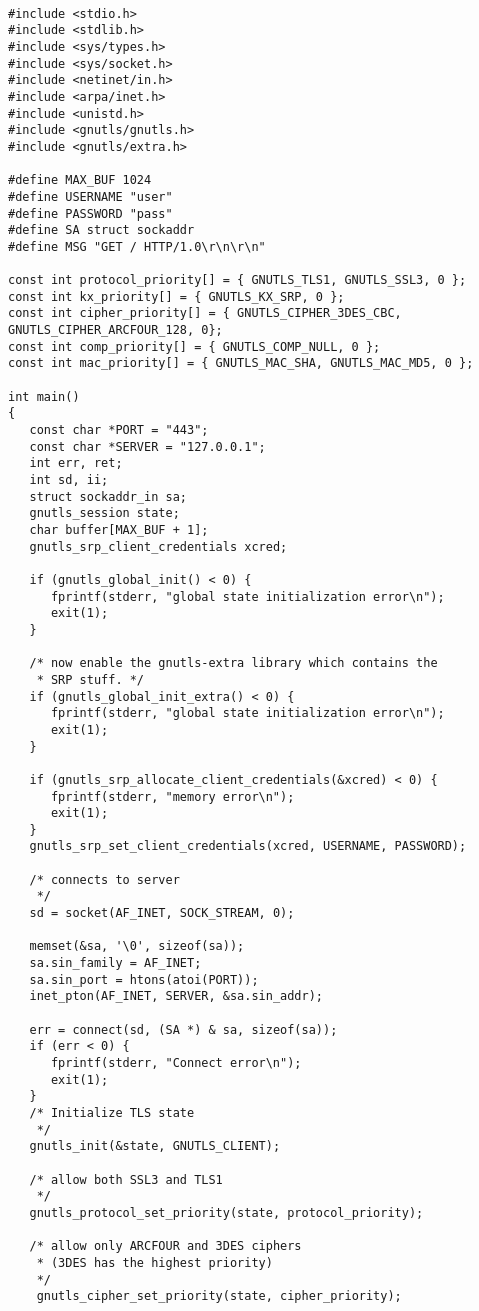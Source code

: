 \begin{verbatim}

#include <stdio.h>
#include <stdlib.h>
#include <sys/types.h>
#include <sys/socket.h>
#include <netinet/in.h>
#include <arpa/inet.h>
#include <unistd.h>
#include <gnutls/gnutls.h>
#include <gnutls/extra.h>

#define MAX_BUF 1024
#define USERNAME "user"
#define PASSWORD "pass"
#define SA struct sockaddr
#define MSG "GET / HTTP/1.0\r\n\r\n"

const int protocol_priority[] = { GNUTLS_TLS1, GNUTLS_SSL3, 0 };
const int kx_priority[] = { GNUTLS_KX_SRP, 0 };
const int cipher_priority[] = { GNUTLS_CIPHER_3DES_CBC, GNUTLS_CIPHER_ARCFOUR_128, 0};
const int comp_priority[] = { GNUTLS_COMP_NULL, 0 };
const int mac_priority[] = { GNUTLS_MAC_SHA, GNUTLS_MAC_MD5, 0 };

int main()
{
   const char *PORT = "443";
   const char *SERVER = "127.0.0.1";
   int err, ret;
   int sd, ii;
   struct sockaddr_in sa;
   gnutls_session state;
   char buffer[MAX_BUF + 1];
   gnutls_srp_client_credentials xcred;

   if (gnutls_global_init() < 0) {
      fprintf(stderr, "global state initialization error\n");
      exit(1);
   }

   /* now enable the gnutls-extra library which contains the
    * SRP stuff. */
   if (gnutls_global_init_extra() < 0) {
      fprintf(stderr, "global state initialization error\n");
      exit(1);
   }

   if (gnutls_srp_allocate_client_credentials(&xcred) < 0) {
      fprintf(stderr, "memory error\n");
      exit(1);
   }
   gnutls_srp_set_client_credentials(xcred, USERNAME, PASSWORD);

   /* connects to server 
    */
   sd = socket(AF_INET, SOCK_STREAM, 0);

   memset(&sa, '\0', sizeof(sa));
   sa.sin_family = AF_INET;
   sa.sin_port = htons(atoi(PORT));
   inet_pton(AF_INET, SERVER, &sa.sin_addr);

   err = connect(sd, (SA *) & sa, sizeof(sa));
   if (err < 0) {
      fprintf(stderr, "Connect error\n");
      exit(1);
   }
   /* Initialize TLS state 
    */
   gnutls_init(&state, GNUTLS_CLIENT);

   /* allow both SSL3 and TLS1
    */
   gnutls_protocol_set_priority(state, protocol_priority);
 
   /* allow only ARCFOUR and 3DES ciphers
    * (3DES has the highest priority)
    */
    gnutls_cipher_set_priority(state, cipher_priority);


\end{verbatim}
